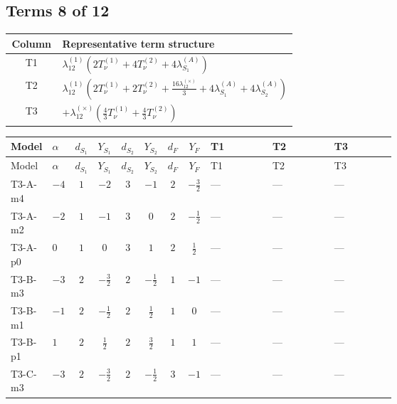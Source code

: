 \documentclass[8pt]{article}
\begin{document}
\begin{landscape}
\subsection*{Terms 8 of 12}
\begin{center}
\begin{tabular}{@{}c >{\raggedright\arraybackslash}p{0.82\linewidth}@{}}
\toprule
Column & Representative term structure \\
\midrule
T1 & \(\displaystyle {\lambda_{12}^{(1)}} (2 T_{\nu}^{(1)}+4 T_{\nu}^{(2)}+4 {\lambda_{S_1}^{(A)}})\) \\
\midrule
T2 & \(\displaystyle {\lambda_{12}^{(1)}} \left(2 T_{\nu}^{(1)}+2 T_{\nu}^{(2)}+\frac{16 {\lambda_{12}^{(\times)}}}{3}+4 {\lambda_{S_1}^{(A)}}+4 {\lambda_{S_2}^{(A)}}\right)\) \\
\midrule
T3 & \(\displaystyle +{\lambda_{12}^{(\times)}} \left(\frac{4}{3} T_{\nu}^{(1)}+\frac{4}{3} T_{\nu}^{(2)}\right)\) \\
\midrule
\bottomrule
\end{tabular}
\end{center}
\smallskip
\tiny
\begin{longtable}{@{}llcccccc >{\raggedright\arraybackslash}p{0.21\linewidth} >{\raggedright\arraybackslash}p{0.21\linewidth} >{\raggedright\arraybackslash}p{0.21\linewidth}@{}}
\toprule
Model & $\alpha$ & $d_{S_1}$ & $Y_{S_1}$ & $d_{S_2}$ & $Y_{S_2}$ & $d_F$ & $Y_F$ & T1 & T2 & T3 \\
\midrule
\endfirsthead
\toprule
Model & $\alpha$ & $d_{S_1}$ & $Y_{S_1}$ & $d_{S_2}$ & $Y_{S_2}$ & $d_F$ & $Y_F$ & T1 & T2 & T3 \\
\midrule
\endhead
T3-A-m4 & $-4$ & $1$ & $-2$ & $3$ & $-1$ & $2$ & $-\frac{3}{2}$ & --- & --- & --- \\
\midrule
T3-A-m2 & $-2$ & $1$ & $-1$ & $3$ & $0$ & $2$ & $-\frac{1}{2}$ & --- & --- & --- \\
\midrule
T3-A-p0 & $0$ & $1$ & $0$ & $3$ & $1$ & $2$ & $\frac{1}{2}$ & --- & --- & --- \\
\midrule
T3-B-m3 & $-3$ & $2$ & $-\frac{3}{2}$ & $2$ & $-\frac{1}{2}$ & $1$ & $-1$ & --- & --- & --- \\
\midrule
T3-B-m1 & $-1$ & $2$ & $-\frac{1}{2}$ & $2$ & $\frac{1}{2}$ & $1$ & $0$ & --- & --- & --- \\
\midrule
T3-B-p1 & $1$ & $2$ & $\frac{1}{2}$ & $2$ & $\frac{3}{2}$ & $1$ & $1$ & --- & --- & --- \\
\midrule
T3-C-m3 & $-3$ & $2$ & $-\frac{3}{2}$ & $2$ & $-\frac{1}{2}$ & $3$ & $-1$ & --- & --- & --- \\

\end{longtable}
\end{landscape}
\end{document}

